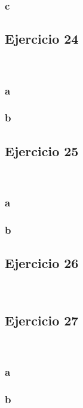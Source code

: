 \documentclass{article}
\begin{document}
\subsubsection*{c}

\subsection*{Ejercicio 24}

\

\subsubsection*{a}

\subsubsection*{b}

\subsection*{Ejercicio 25}

\

\subsubsection*{a}

\subsubsection*{b}

\subsection*{Ejercicio 26}

\

\subsection*{Ejercicio 27}

\

\subsubsection*{a}

\subsubsection*{b}
\end{document}
